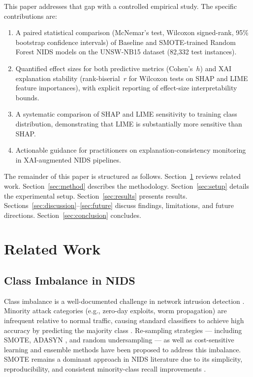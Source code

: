 \documentclass[conference,a4paper]{IEEEtran}
\newcommand{\NIDS}{NIDS\xspace}
\newcommand{\SMOTE}{SMOTE\xspace}
\newcommand{\XAI}{XAI\xspace}
\newcommand{\rbs}{rank-biserial~$r$\xspace}
\newcommand{\cohensh}{Cohen's~$h$\xspace}
\begin{document}
This paper addresses that gap with a controlled empirical study. The specific
contributions are:
\begin{enumerate}
  \item A paired statistical comparison (McNemar's test, Wilcoxon signed-rank,
        95\% bootstrap confidence intervals) of Baseline and \SMOTE-trained Random
        Forest \NIDS models on the UNSW-NB15 dataset (82,332 test instances).
  \item Quantified effect sizes for both predictive metrics (\cohensh) and \XAI
        explanation stability (\rbs for Wilcoxon tests on SHAP and LIME feature
        importances), with explicit reporting of effect-size interpretability bounds.
  \item A systematic comparison of SHAP and LIME sensitivity to training class
        distribution, demonstrating that LIME is substantially more sensitive
        than SHAP.
  \item Actionable guidance for practitioners on explanation-consistency monitoring
        in \XAI-augmented \NIDS pipelines.
\end{enumerate}

The remainder of this paper is structured as follows. Section~\ref{sec:related}
reviews related work. Section~\ref{sec:method} describes the methodology.
Section~\ref{sec:setup} details the experimental setup. Section~\ref{sec:results}
presents results. Sections~\ref{sec:discussion}--\ref{sec:future} discuss findings,
limitations, and future directions. Section~\ref{sec:conclusion} concludes.

\section{Related Work}
\label{sec:related}

\subsection{Class Imbalance in NIDS}

Class imbalance is a well-documented challenge in network intrusion
detection \cite{moustafa2015,shanmugam2025}. Minority attack categories (e.g.,
zero-day exploits, worm propagation) are infrequent relative to normal traffic,
causing standard classifiers to achieve high accuracy by predicting the majority
class \cite{alshamy2021,chawla2002}. Re-sampling strategies --- including
\SMOTE \cite{chawla2002}, ADASYN \cite{shanmugam2025}, and random
undersampling \cite{shanmugam2025} --- as well as cost-sensitive
learning \cite{shanmugam2025} and ensemble methods \cite{shanmugam2025} have been
proposed to address this imbalance. \SMOTE remains a dominant approach in \NIDS
literature due to its simplicity, reproducibility, and consistent minority-class
recall improvements \cite{wu2022,sayegh2024}.
\end{document}
